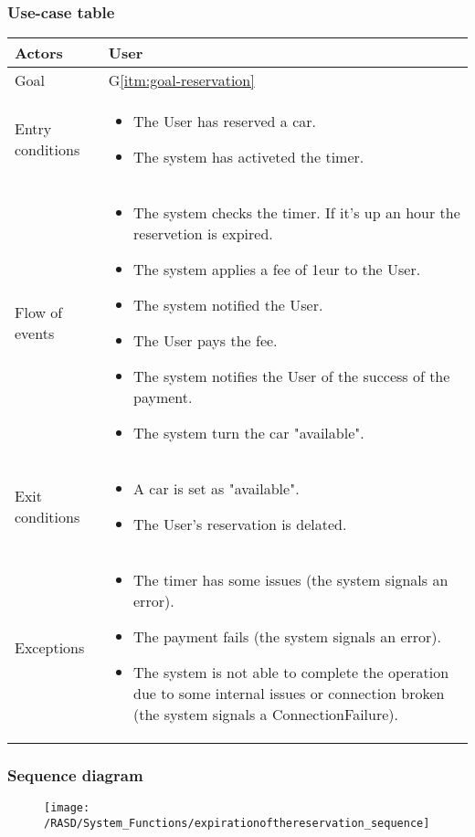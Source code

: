 \subsubsection{Use-case table}
\begin{center}
  \begin{tabular}{ l | p{10cm} }
    \hline
    Actors & User\\ \hline
    Goal & G\ref{itm:goal-reservation}\\ \hline
    Entry conditions & \begin{itemize}
			\item The User has reserved a car.
			\item The system has activeted the timer.
\end{itemize}  \\ \hline
    Flow of events &
\begin{itemize}
\item The system checks the timer. If it's up an hour the reservetion is expired.
\item The system applies a fee of 1eur to the User.
\item The system notified the User.
\item The User pays the fee.
\item The system notifies the User of the success of the payment.
\item The system turn the car "available".
\end{itemize} \\ \hline
    Exit conditions &
\begin{itemize}
	\item A car is set as "available".
	\item The User's reservation is delated.
\end{itemize}  \\ \hline
  Exceptions & 
\begin{itemize}
\item The timer has some issues (the system signals an error).
\item The payment fails (the system signals an error).
\item The system is not able to complete the operation due to some internal issues or connection broken (the system signals a ConnectionFailure).
\end{itemize} 
\\ \hline
  \end{tabular}
\end{center}


\newpage
\subsubsection{Sequence diagram}
\begin{figure}[!ht]
  \centering
  \vspace{0.2cm}
  \texttt{[image: /RASD/System\_Functions/expirationofthereservation\_sequence]}\\
  \vspace{0.1cm}
  \label{fig:expirationofthereservation_sequence} 
\end{figure}

